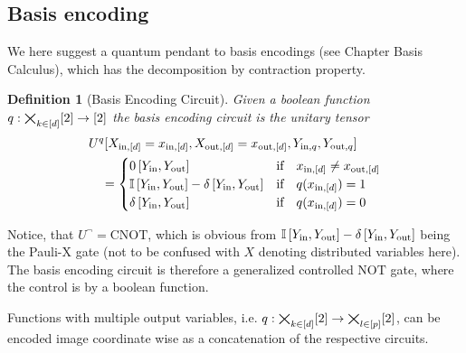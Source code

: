 \documentclass[aps,onecolumn,nofootinbib,pra]{article}
\newtheorem{definition}{Definition}
\begin{document}
    \subsection{Basis encoding}

    We here suggest a quantum pendant to basis encodings (see Chapter Basis Calculus), which has the decomposition by contraction property.

    \begin{definition}[Basis Encoding Circuit]
        Given a boolean function $q:\bigtimes_{k\in[d]}[2]\rightarrow[2]$ the basis encoding circuit is the unitary tensor
        \begin{align*}
            &U^{q}[X_{\mathrm{in},[d]}=x_{\mathrm{in},[d]},X_{\mathrm{out},[d]}=x_{\mathrm{out},[d]},Y_{\mathrm{in},q},Y_{\mathrm{out},q}] \\
            &\quad=
            \begin{cases}
                0\left[Y_{\mathrm{in}},Y_{\mathrm{out}}\right]
                & \text{if}\quad x_{\mathrm{in},[d]}\neq x_{\mathrm{out},[d]} \\
                \mathbb{I}\left[Y_{\mathrm{in}},Y_{\mathrm{out}}\right] - \delta\left[Y_{\mathrm{in}},Y_{\mathrm{out}}\right]
                & \text{if}\quad q(x_{\mathrm{in},[d]}) = 1 \\
                \delta\left[Y_{\mathrm{in}},Y_{\mathrm{out}}\right]
                & \text{if}\quad q(x_{\mathrm{in},[d]}) = 0 \\
            \end{cases}
        \end{align*}
    \end{definition}

    Notice, that $U^{\lnot} = \mathrm{CNOT}$, which is obvious from $\mathbb{I}\left[Y_{\mathrm{in}},Y_{\mathrm{out}}\right] - \delta\left[Y_{\mathrm{in}},Y_{\mathrm{out}}\right]$ being the Pauli-X gate (not to be confused with $X$ denoting distributed variables here).
    The basis encoding circuit is therefore a generalized controlled $\mathrm{NOT}$ gate, where the control is by a boolean function.

    Functions with multiple output variables, i.e. $q:\bigtimes_{k\in[d]}[2]\rightarrow\bigtimes_{l\in[p]}[2]$, can be encoded image coordinate wise as a concatenation of the respective circuits.
\end{document}
